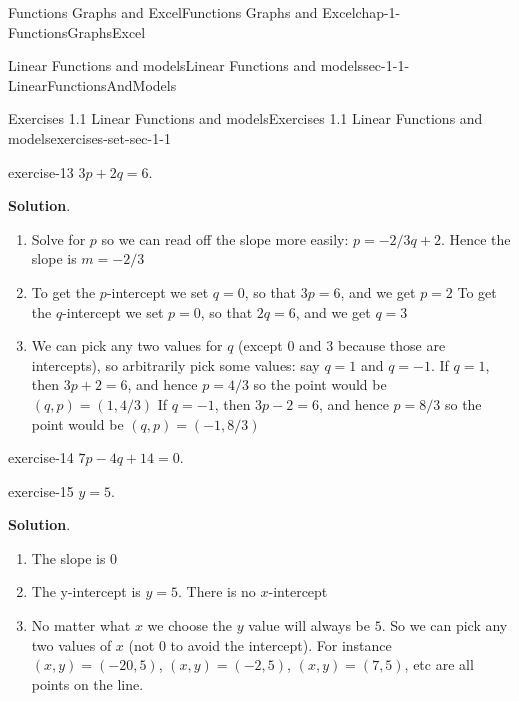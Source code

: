 \documentclass[oneside,10pt,]{book}
\numberwithin{equation}{section}
\begin{document}
\begin{chapterptx}{Functions Graphs and Excel}{}{Functions Graphs and Excel}{}{}{chap-1-FunctionsGraphsExcel}
\begin{sectionptx}{Linear Functions and models}{}{Linear Functions and models}{}{}{sec-1-1-LinearFunctionsAndModels}
\begin{exercises-subsection-numberless}{Exercises 1.1 Linear Functions and models}{}{Exercises 1.1 Linear Functions and models}{}{}{exercises-set-sec-1-1}
\begin{enumerate}[label=(\alph*)]
\end{enumerate}
\begin{exercisegroup}
\begin{divisionexerciseeg}{13}{}{}{exercise-13}%
\hypertarget{p-114}{}%
\(3 p+2 q=6\).%
\par\smallskip%
\noindent\textbf{Solution}.\hypertarget{solution-7}{}\quad%
\leavevmode%
\begin{enumerate}[label=(\alph*)]
\item\hypertarget{li-51}{}\hypertarget{p-115}{}%
Solve for \(p\) so we can read off the slope more easily:  \(p= -2/3 q+2\). Hence the slope is \(m= -2/3\)%
\item\hypertarget{li-52}{}\hypertarget{p-116}{}%
To get the \(p\)-intercept we set \(q=0\), so that \(3 p=6\), and we get \(p=2\) To get the \(q\)-intercept we set \(p=0\), so that \(2q=6\), and we get \(q=3\)%
\item\hypertarget{li-53}{}\hypertarget{p-117}{}%
We can pick any two values for \(q\) (except \(0\) and \(3\) because those are intercepts), so arbitrarily pick some values: say \(q=1\) and \(q=-1\). If \(q=1\), then \(3 p+2=6\), and hence  \(p=4/3\) so the point would be \((q,p)=(1,4/3)\) If \(q=-1\), then \(3 p-2=6\), and hence  \(p=8/3\) so the point would be \((q,p)=(-1,8/3  )\)%
\end{enumerate}
\end{divisionexerciseeg}%
\begin{divisionexerciseeg}{14}{}{}{exercise-14}%
\hypertarget{p-118}{}%
\(7 p-4 q+14=0\).%
\end{divisionexerciseeg}%
\begin{divisionexerciseeg}{15}{}{}{exercise-15}%
\hypertarget{p-119}{}%
\(y=5\).%
\par\smallskip%
\noindent\textbf{Solution}.\hypertarget{solution-8}{}\quad%
\leavevmode%
\begin{enumerate}[label=(\alph*)]
\item\hypertarget{li-54}{}\hypertarget{p-120}{}%
The slope is \(0\)%
\item\hypertarget{li-55}{}\hypertarget{p-121}{}%
The y-intercept is \(y = 5\). There is no \(x\)-intercept%
\item\hypertarget{li-56}{}\hypertarget{p-122}{}%
No matter what \(x\) we choose the \(y\) value will always be \(5\). So we can pick any two values of \(x\) (not \(0\) to avoid the intercept). For instance \((x,y)=(-20,5)\), \((x,y)=(-2,5)\), \((x,y)=(7,5)\), etc are all points on the line.%
\end{enumerate}

\end{divisionexerciseeg}
\end{exercisegroup}
\end{exercises-subsection-numberless}
\end{sectionptx}
\end{chapterptx}
\end{document}
